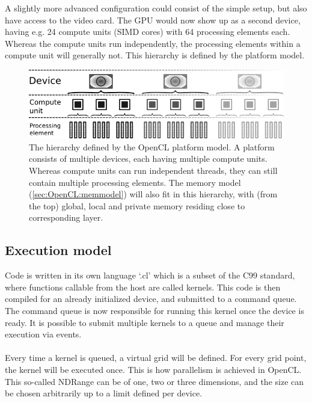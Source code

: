 A slightly more advanced configuration could consist of the simple setup, but also have access to the video card.
The GPU would now show up as a second device, having e.g. 24 compute units (SIMD cores) with 64 processing elements each. Whereas the compute units run independently, the processing elements within a compute unit will generally not.
This hierarchy is defined by the platform model.

\begin{figure}
\begin{center}
\includegraphics[scale=0.5]{../08-OpenCL/figs/platform.png}
\caption{The hierarchy defined by the OpenCL platform model.
A platform consists of multiple devices, each having multiple compute units. Whereas compute units can run independent threads, they can still contain multiple processing elements.
The memory model (\ref{sec:OpenCL:memmodel}) will also fit in this hierarchy, with (from the top) global, local and private memory residing close to corresponding layer.}
\label{fig:OpenCL:platform}
\end{center}
\end{figure}


\subsection{Execution model}
Code is written in its own language `.cl' which is a subset of the C99 standard, where functions callable from the host are called kernels.
This code is then compiled for an already initialized device, and submitted to a command queue.
The command queue is now responsible for running this kernel once the device is ready. 
It is possible to submit multiple kernels to a queue and manage their execution via events.

\paragraph*{}
Every time a kernel is queued, a virtual grid will be defined.
For every grid point, the kernel will be executed once.
This is how parallelism is achieved in OpenCL.
This so-called NDRange can be of one, two or three dimensions, and the size can be chosen arbitrarily up to a limit defined per device.

